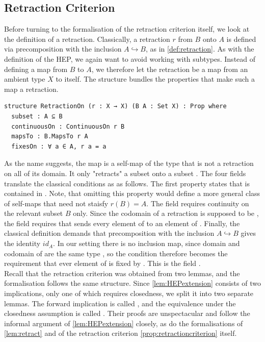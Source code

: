 \documentclass[11pt, a4paper, english]{article}
\theoremstyle{plain}
\theoremstyle{definition}
\theoremstyle{remark}
\numberwithin{equation}{section}
\numberwithin{theorem}{section}
\begin{document}
\subsection{Retraction Criterion} \label{subsec:lean:retractioncriterion}

Before turning to the formalisation of the retraction criterion itself, we look at the definition of a retraction. Classically, a retraction $r$ from $B$ onto $A$ is defined via precomposition with the inclusion $A \hookrightarrow B$, as in \cref{def:retraction}. As with the definition of the HEP, we again want to avoid working with subtypes. Instead of defining a map from $B$ to $A$, we therefore let the retraction be a map from an ambient type $X$ to itself. The structure  bundles the properties that make such a map a retraction.

\begin{verbatim}
structure RetractionOn (r : X → X) (B A : Set X) : Prop where
  subset : A ⊆ B
  continuousOn : ContinuousOn r B
  mapsTo : B.MapsTo r A
  fixesOn : ∀ a ∈ A, r a = a
\end{verbatim}

As the name  suggests, the map  is a self-map of the
type  that is not a retraction on all of its domain. It only "retracts" a subset  onto a subset . The four fields translate the classical conditions as as follows. The first property  states that  is contained in . Note, that omitting this property would define a more general class of self-maps that need not staisfy $r(B) = A$. The field  requires continuity on the relevant subset $B$ only. Since the codomain of a retraction is supposed to be , the field  requires that  sends every element of  to an element of . Finally, the classical definition demands that precomposition with the inclusion $A \hookrightarrow B$ gives the identity $id_A$. In our setting there is no inclusion map, since domain and codomain of  are the same type , so the condition therefore becomes the requirement that ever element of  is fixed by . This is the field . \\

Recall that the retraction criterion was obtained from two lemmas, and the formalisation follows the same structure. Since \cref{lem:HEPextension} consists of two implications, only one of which requires closedness, we split it into two separate lemmas. The forward implication is called , and the equivalence under the closedness assumption is called . Their proofs are unspectacular and follow the informal argument of \cref{lem:HEPextension} closely, as do the formalisations of \cref{lem:retract} and of the retraction criterion \cref{prop:retractioncriterion} itself. 
\end{document}
